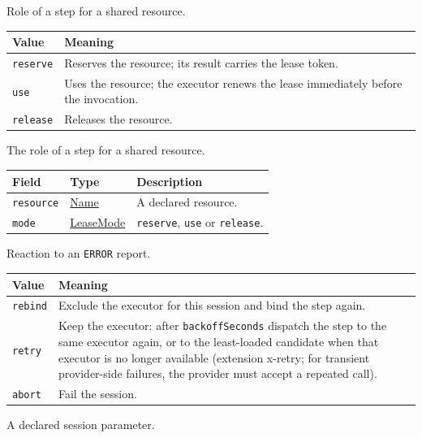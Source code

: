 \documentclass[a4paper]{arrowhead}
\newcommand{\mref}[1]{{\textcolor{ArrowheadPurple}{\hyperref[sec:model:#1]{#1}}}}
\newcommand{\pref}[1]{{\textcolor{ArrowheadGrey}{\hyperref[sec:model:primitives:#1]{#1}}}}
\begin{document}
Role of a step for a shared resource.

{\small
\begin{longtable}{|p{3.9cm}|p{11.9cm}|}

\hline
\rowcolor{gray!33} Value & Meaning \\ \hline
\endhead
\texttt{reserve} & Reserves the resource; its result carries the lease token. \\ \hline
\texttt{use} & Uses the resource; the executor renews the lease immediately before the invocation. \\ \hline
\texttt{release} & Releases the resource. \\ \hline
\end{longtable}
}

The role of a step for a shared resource.

{\small
\begin{longtable}{|p{3.9cm}|p{4.4cm}|p{7.5cm}|}

\hline
\rowcolor{gray!33} Field & Type & Description \\ \hline
\endhead
\texttt{resource} & \pref{Name} & A declared resource. \\ \hline
\texttt{mode} & \mref{LeaseMode} & \texttt{reserve}, \texttt{use} or \texttt{release}. \\ \hline
\end{longtable}
}

Reaction to an \texttt{ERROR} report.

{\small
\begin{longtable}{|p{3.9cm}|p{11.9cm}|}

\hline
\rowcolor{gray!33} Value & Meaning \\ \hline
\endhead
\texttt{rebind} & Exclude the executor for this session and bind the step again. \\ \hline
\texttt{retry} & Keep the executor: after \texttt{backoff\allowbreak{}Seconds} dispatch the step to the same executor again, or to the least-loaded candidate when that executor is no longer available (extension x-retry; for transient provider-side failures, the provider must accept a repeated call). \\ \hline
\texttt{abort} & Fail the session. \\ \hline
\end{longtable}
}

A declared session parameter.
\end{document}
